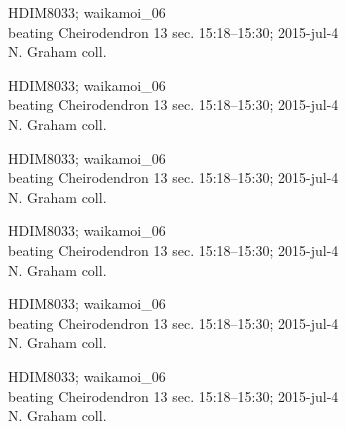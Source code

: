 \documentclass[2pt]{extarticle}
\begin{document}
\noindent
\parbox{0.16\textwidth}{\tiny \raggedright \rule[-0.3\baselineskip]{0pt}{10pt}HDIM8033; waikamoi\_06\\ beating Cheirodendron 13 sec. 15:18--15:30; 2015-jul-4\\ N. Graham coll.}
\parbox{0.16\textwidth}{\tiny \raggedright \rule[-0.3\baselineskip]{0pt}{10pt}HDIM8033; waikamoi\_06\\ beating Cheirodendron 13 sec. 15:18--15:30; 2015-jul-4\\ N. Graham coll.}
\parbox{0.16\textwidth}{\tiny \raggedright \rule[-0.3\baselineskip]{0pt}{10pt}HDIM8033; waikamoi\_06\\ beating Cheirodendron 13 sec. 15:18--15:30; 2015-jul-4\\ N. Graham coll.}
\parbox{0.16\textwidth}{\tiny \raggedright \rule[-0.3\baselineskip]{0pt}{10pt}HDIM8033; waikamoi\_06\\ beating Cheirodendron 13 sec. 15:18--15:30; 2015-jul-4\\ N. Graham coll.}
\parbox{0.16\textwidth}{\tiny \raggedright \rule[-0.3\baselineskip]{0pt}{10pt}HDIM8033; waikamoi\_06\\ beating Cheirodendron 13 sec. 15:18--15:30; 2015-jul-4\\ N. Graham coll.}
\parbox{0.16\textwidth}{\tiny \raggedright \rule[-0.3\baselineskip]{0pt}{10pt}HDIM8033; waikamoi\_06\\ beating Cheirodendron 13 sec. 15:18--15:30; 2015-jul-4\\ N. Graham coll.} \\ 
\vspace{0.001in} 
\end{document}
